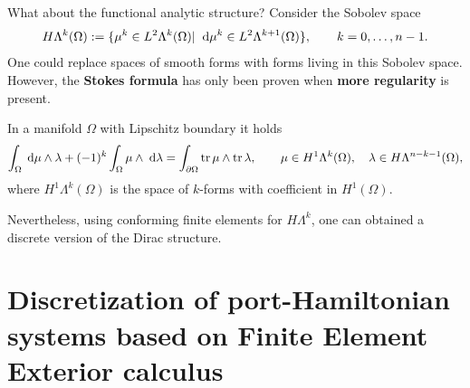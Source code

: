 \documentclass[aspectratio=169]{beamer}
\DeclareMathOperator{\tr}{tr}
\begin{document}
\begin{frame}{What about the functional analytic structure?}
Consider the Sobolev space
\begin{equation*}
	H\Lambda^k(\Omega) := \{\mu^k \in L^2 \Lambda^k(\Omega) \vert \; \d{\mu^k} \in L^2 \Lambda^{k+1}(\Omega)\}, \qquad k=0, \dots, n-1.
\end{equation*}
One could replace spaces of smooth forms with forms living in this Sobolev space. \\
However, the \textbf{Stokes formula} has only been proven when \textbf{more regularity} is present.
\begin{theorem}
	In a manifold $\Omega$ with Lipschitz boundary it holds
	\begin{equation*}
		\int_\Omega \d{\mu} \wedge \lambda + (-1)^k \int_\Omega \mu \wedge \d{\lambda} = \int_{\partial \Omega}\tr {\mu} \wedge \tr{\lambda}, \qquad \mu \in H^1\Lambda^{k}(\Omega), \quad \lambda \in H \Lambda^{n-k-1}(\Omega),
	\end{equation*}
	where $H^1\Lambda^k(\Omega)$ is the space of $k$-forms with coefficient in $H^1(\Omega)$.
\end{theorem}

Nevertheless, using conforming finite elements for $H\Lambda^k$, one can obtained a discrete version of the Dirac structure.

\end{frame}

\section{Discretization of port-Hamiltonian systems based on Finite Element Exterior calculus}
\end{document}
